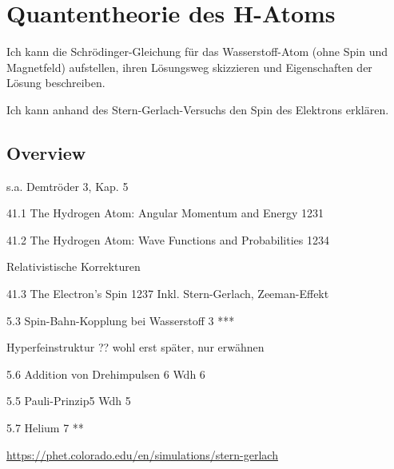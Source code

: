 \renewcommand{\lastmod}{10. September 2024}
\renewcommand{\chapterauthors}{Markus Lippitz}

\chapter{Quantentheorie des H-Atoms}




Ich kann die Schrödinger-Gleichung für das Wasserstoff-Atom (ohne Spin und Magnetfeld) aufstellen, ihren Lösungsweg skizzieren und Eigenschaften der Lösung beschreiben.

Ich kann anhand des Stern-Gerlach-Versuchs den Spin des Elektrons erklären.


\section{Overview}

s.a. Demtröder 3, Kap. 5

41.1 The Hydrogen Atom: Angular Momentum and Energy 1231

41.2 The Hydrogen Atom: Wave Functions and Probabilities 1234

Relativistische Korrekturen

41.3 The Electron's Spin 1237
Inkl. Stern-Gerlach, Zeeman-Effekt

5.3 Spin-Bahn-Kopplung bei Wasserstoff 3	***	

Hyperfeinstruktur ?? wohl erst später, nur erwähnen

5.6 Addition von Drehimpulsen 6	Wdh	6 

5.5 Pauli-Prinzip5	Wdh	5 

5.7 Helium 7	**	


\url{https://phet.colorado.edu/en/simulations/stern-gerlach}






